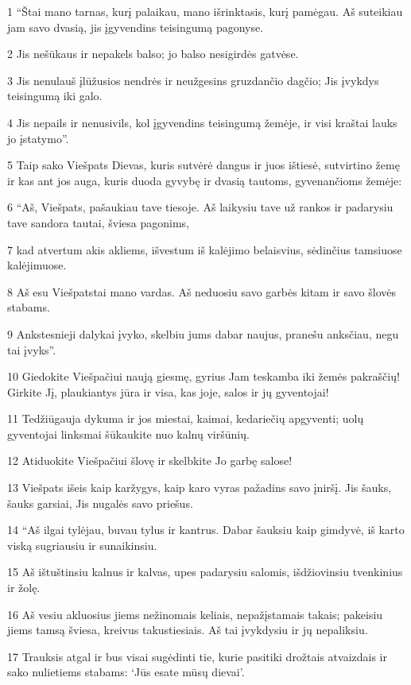 \par 1 “Štai mano tarnas, kurį palaikau, mano išrinktasis, kurį pamėgau. Aš suteikiau jam savo dvasią, jis įgyvendins teisingumą pagonyse. 
\par 2 Jis nešūkaus ir nepakels balso; jo balso nesigirdės gatvėse. 
\par 3 Jis nenulauš įlūžusios nendrės ir neužgesins gruzdančio dagčio; Jis įvykdys teisingumą iki galo. 
\par 4 Jis nepails ir nenusivils, kol įgyvendins teisingumą žemėje, ir visi kraštai lauks jo įstatymo”. 
\par 5 Taip sako Viešpats Dievas, kuris sutvėrė dangus ir juos ištiesė, sutvirtino žemę ir kas ant jos auga, kuris duoda gyvybę ir dvasią tautoms, gyvenančioms žemėje: 
\par 6 “Aš, Viešpats, pašaukiau tave tiesoje. Aš laikysiu tave už rankos ir padarysiu tave sandora tautai, šviesa pagonims, 
\par 7 kad atvertum akis akliems, išvestum iš kalėjimo belaisvius, sėdinčius tamsiuose kalėjimuose. 
\par 8 Aš esu Viešpats­tai mano vardas. Aš neduosiu savo garbės kitam ir savo šlovės stabams. 
\par 9 Ankstesnieji dalykai įvyko, skelbiu jums dabar naujus, pranešu anksčiau, negu tai įvyks”. 
\par 10 Giedokite Viešpačiui naują giesmę, gyrius Jam teskamba iki žemės pakraščių! Girkite Jį, plaukiantys jūra ir visa, kas joje, salos ir jų gyventojai! 
\par 11 Tedžiūgauja dykuma ir jos miestai, kaimai, kedariečių apgyventi; uolų gyventojai linksmai šūkaukite nuo kalnų viršūnių. 
\par 12 Atiduokite Viešpačiui šlovę ir skelbkite Jo garbę salose! 
\par 13 Viešpats išeis kaip karžygys, kaip karo vyras pažadins savo įniršį. Jis šauks, šauks garsiai, Jis nugalės savo priešus. 
\par 14 “Aš ilgai tylėjau, buvau tylus ir kantrus. Dabar šauksiu kaip gimdyvė, iš karto viską sugriausiu ir sunaikinsiu. 
\par 15 Aš ištuštinsiu kalnus ir kalvas, upes padarysiu salomis, išdžiovinsiu tvenkinius ir žolę. 
\par 16 Aš vesiu akluosius jiems nežinomais keliais, nepažįstamais takais; pakeisiu jiems tamsą šviesa, kreivus takus­tiesiais. Aš tai įvykdysiu ir jų nepaliksiu. 
\par 17 Trauksis atgal ir bus visai sugėdinti tie, kurie pasitiki drožtais atvaizdais ir sako nulietiems stabams: ‘Jūs esate mūsų dievai’. 
